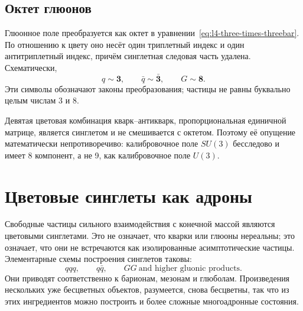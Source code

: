 \begin{classroomqa}
\end{classroomqa}

\subsection{Октет глюонов}

Глюонное поле преобразуется как октет в уравнении~\eqref{eq:l4-three-times-threebar}. По отношению к цвету оно несёт
один триплетный индекс и один антитриплетный индекс, причём синглетная следовая часть удалена.
Схематически,
\begin{equation}
q\sim\boldsymbol 3,
\qquad
\bar q\sim\bar{\boldsymbol 3},
\qquad
G\sim\boldsymbol 8.
\end{equation}
Эти символы обозначают законы преобразования; частицы не равны буквально
целым числам 3 и 8.

Девятая цветовая комбинация кварк--антикварк, пропорциональная единичной матрице,
является синглетом и не смешивается с октетом. Поэтому её опущение
математически непротиворечиво: калибровочное поле \(SU(3)\) бесследово и имеет 8
компонент, а не 9, как калибровочное поле \(U(3)\).

\begin{classroomqa}
\end{classroomqa}

\section{Цветовые синглеты как адроны}

Свободные частицы сильного взаимодействия с конечной массой являются цветовыми синглетами.
Это не означает, что кварки или глюоны нереальны; это означает, что они не встречаются как
изолированные асимптотические частицы. Элементарные схемы построения синглетов таковы:
\begin{equation}
qqq,
\qquad
q\bar q,
\qquad
GG\ \text{and higher gluonic products}.
\end{equation}
Они приводят соответственно к барионам, мезонам и глюболам. Произведения нескольких
уже бесцветных объектов, разумеется, снова бесцветны, так что из этих ингредиентов можно построить
и более сложные многоадронные состояния.

